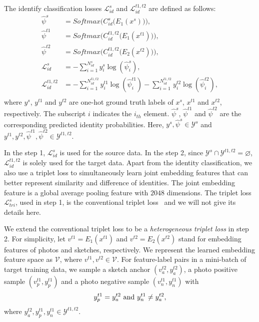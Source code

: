 \documentclass[journal]{IEEEtran}
\begin{document}
The identify classification losses $\mathcal{L}^{s}_{id}$ and $\mathcal{L}^{t1,t2}_{id}$ are defined as follows:
\begin{equation}
    \begin{split}
    \hat{\psi}^{s}& =  Softmax \bigg( C^{s}_{id} \big(E_{1}(x^{s}) \big) \bigg), \\
    \hat{\psi}^{t1}& =  Softmax \bigg(  C^{t1,t2}_{id} \big(E_{1}(x^{t1}) \big) \bigg), \\
\hat{\psi}^{t2} &=  Softmax \bigg(  C^{t1,t2}_{id} \big(E_{2}(x^{t2}) \big) \bigg), \\
    \mathcal{L}^{s}_{id} &=
         -\sum_{i=1}^{N^{s}_{id}} y^{s}_{i} \log (\hat{\psi}^{s}_{i}),\\
    \mathcal{L}^{t1,t2}_{id} &=
         -\sum_{i=1}^{N^{t1,t2}_{id}} y^{t1}_{i} \log (\hat{\psi}^{t1}_{i}) - \sum_{i=1}^{N^{t1,t2}_{id}} y^{t2}_{i} \log (\hat{\psi}^{t2}_{i}),\\
    \end{split}
\end{equation}
where $y^{s}$, $y^{t1}$ and $y^{t2}$ are one-hot ground truth labels of $x^s$, $x^{t1}$ and $x^{t2}$, respectively. The subscript $i$ indicates the $i_{th}$ element. $\hat{\psi}^{s}$, $\hat{\psi}^{t1}$ and $\hat{\psi}^{t2}$ are the corresponding predicted identity probabilities. Here, $y^{s}, \hat{\psi}^{s}\in \mathcal{Y}^{s}$ and $y^{t1}, y^{t2}, \hat{\psi}^{t1}, \hat{\psi}^{t2} \in \mathcal{Y}^{t1,t2}$.

In the step 1, $\mathcal{L}^{s}_{id}$ is used for the source data. In the step 2, since $\mathcal{Y}^{s} \cap \mathcal{Y}^{t1,t2} = \varnothing$, $\mathcal{L}^{t1,t2}_{id}$ is solely used for the target data. Apart from the identity classification, we also use a triplet loss to simultaneously learn joint embedding features that can better represent similarity and difference of identities. The joint embedding feature is a global average pooling feature with $2048$ dimensions. The triplet loss $\mathcal{L}^{s}_{tri}$, used in step 1, is the conventional triplet loss~\cite{chechik2010large} and we will not give its details here. 

We extend the conventional triplet loss to be a \emph{heterogeneous triplet loss} in step 2. For simplicity, let $v^{t1}\!=\!E_{1} (x^{t1})$ and $v^{t2}\!=\!E_{2}(x^{t2})$ stand for embedding features of photos and sketches, respectively. We represent the learned embedding feature space as $\mathcal{V}$, where $v^{t1},v^{t2} \in \mathcal{V}$. For feature-label pairs in a mini-batch of target training data, we sample a sketch anchor $(v^{t2}_a, y^{t2}_a)$, a photo positive sample $(v^{t1}_p, y^{t1}_p)$ and a photo negative sample $(v^{t1}_n, y^{t1}_n)$ with
\begin{equation}
\scalebox{1}{
\begin{math}
\begin{split}
y^{t1}_p &= y^{t2}_a ~\text{and}~ y^{t1}_n \neq y^{t2}_a, \\
\end{split}
\end{math}
}
\end{equation}
where $ y^{t2}_{a}, y^{t1}_{p},y^{t1}_{n} \in \mathcal{Y}^{t1,t2}$.
\end{document}
